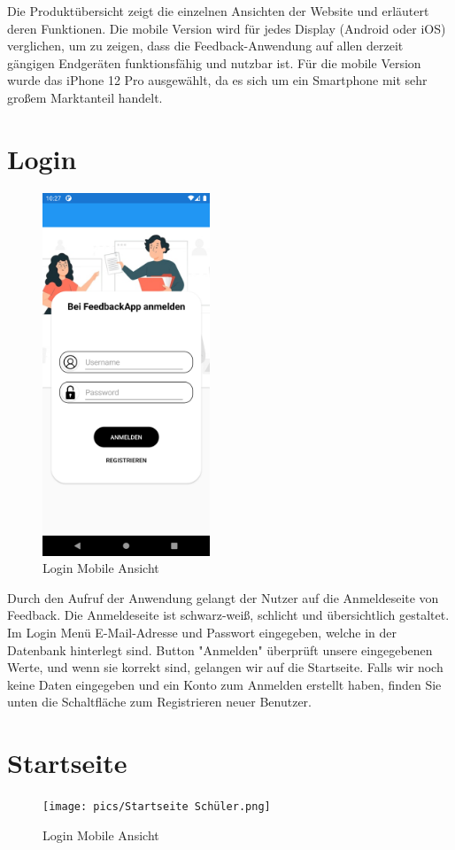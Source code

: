 Die Produktübersicht zeigt die einzelnen Ansichten der Website und erläutert deren 
Funktionen. Die mobile Version wird für jedes Display (Android oder iOS) verglichen, 
um zu zeigen, dass die Feedback-Anwendung auf allen derzeit gängigen Endgeräten 
funktionsfähig und nutzbar ist. Für die mobile Version wurde das iPhone 12 Pro 
ausgewählt, da es sich um ein Smartphone mit sehr großem Marktanteil handelt.
\newpage

\section{Login}
\begin{figure}[h]
    \begin{center}
        \includegraphics*[width=5cm]{pics/LoginPage.png}
        \caption[Login]{Login Mobile Ansicht}
    \end{center}
\end{figure}
Durch den Aufruf der Anwendung gelangt der Nutzer auf die Anmeldeseite 
von Feedback. Die Anmeldeseite ist schwarz-weiß, schlicht und übersichtlich gestaltet.
Im Login Menü E-Mail-Adresse und Passwort eingegeben, welche in 
der Datenbank hinterlegt sind. Button "Anmelden" überprüft unsere 
eingegebenen Werte, und wenn sie korrekt sind, gelangen wir auf die Startseite.
Falls wir noch keine Daten eingegeben und ein Konto zum Anmelden erstellt haben, 
finden Sie unten die Schaltfläche zum Registrieren neuer Benutzer.
\newpage

\section{Startseite}
\begin{figure}[h]
    \begin{center}
        \texttt{[image: pics/Startseite Schüler.png]}
        \caption[Login]{Login Mobile Ansicht}
    \end{center}
\end{figure}

